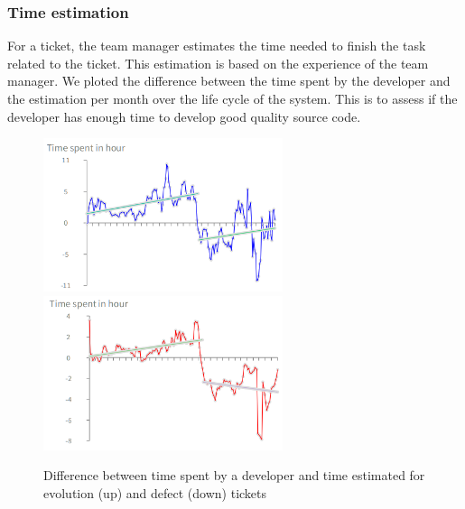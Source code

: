 \documentclass[10pt,conference]{IEEEtran}
\begin{document}
\subsubsection{Time estimation}

For a ticket, the team manager estimates the time needed to finish the task related to the ticket.
This estimation is based on the experience of the team manager.  
We ploted the difference  between the time spent by the developer and the estimation per month over the life cycle of the system.  
This is to assess if the developer has enough time to develop good quality source code.



\begin{figure}[htbp]
  \centering
  \includegraphics[width=70mm]{./images/estimateEvol.png}\\
  \includegraphics[width=70mm]{./images/estimateBug.png}
    \caption{Difference between time spent by a developer  and time estimated for  evolution (up) and defect (down) tickets}
  \label{fig:devEst}
\end{figure}
\end{document}
